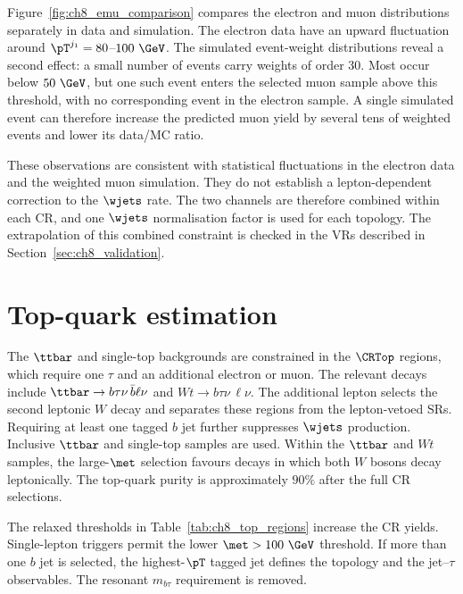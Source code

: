 Figure~\ref{fig:ch8_emu_comparison} compares the electron and muon distributions separately in data and simulation.
The electron data have an upward fluctuation around $\pT^{j_1}=80$--$100~\GeV$.
The simulated event-weight distributions reveal a second effect: a small number of events carry weights of order 30.
Most occur below $50~\GeV$, but one such event enters the selected muon sample above this threshold, with no corresponding event in the electron sample.
A single simulated event can therefore increase the predicted muon yield by several tens of weighted events and lower its data/MC ratio.

These observations are consistent with statistical fluctuations in the electron data and the weighted muon simulation.
They do not establish a lepton-dependent correction to the $\wjets$ rate.
The two channels are therefore combined within each CR, and one $\wjets$ normalisation factor is used for each topology.
The extrapolation of this combined constraint is checked in the VRs described in Section~\ref{sec:ch8_validation}.


\clearpage
\section[Top-quark estimation]{Top-quark estimation}
\label{sec:ch8_top}

The $\ttbar$ and single-top backgrounds are constrained in the $\CRTop$ regions, which require one $\tau$ and an additional electron or muon.
The relevant decays include $\ttbar\to b\tau\nu\,\bar b\ell\nu$ and $Wt\to b\tau\nu\,\ell\nu$.
The additional lepton selects the second leptonic $W$ decay and separates these regions from the lepton-vetoed SRs.
Requiring at least one tagged $b$ jet further suppresses $\wjets$ production.
Inclusive $\ttbar$ and single-top samples are used.
Within the $\ttbar$ and $Wt$ samples, the large-$\met$ selection favours decays in which both $W$ bosons decay leptonically.
The top-quark purity is approximately $90\%$ after the full CR selections.

The relaxed thresholds in Table~\ref{tab:ch8_top_regions} increase the CR yields.
Single-lepton triggers permit the lower $\met>100~\GeV$ threshold.
If more than one $b$ jet is selected, the highest-$\pT$ tagged jet defines the topology and the jet--$\tau$ observables.
The resonant $m_{b\tau}$ requirement is removed.

